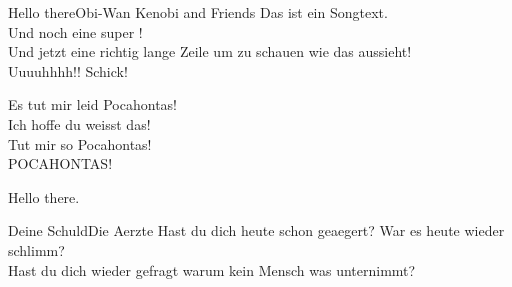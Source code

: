 \documentclass{liederbuch}
\begin{document}
\begin{song}{Hello there}{Obi-Wan Kenobi and Friends}
    Das ist ein  Songtext. \\
    Und noch eine super ! \\
    Und jetzt eine richtig lange Zeile um zu schauen wie das aussieht! \\
    Uuuuhhhh!! Schick!
    \begin{chorus}
    Es tut mir leid Pocahontas! \\
    Ich hoffe du weisst das! \\
    Tut mir so  Pocahontas! \\
    POCAHONTAS!
    \end{chorus}
    Hello there.
\end{song}

\begin{song}{Deine Schuld}{Die Aerzte}
    Hast du dich heute schon geaegert? War es heute wieder schlimm? \\
    Hast du dich wieder gefragt warum kein Mensch was unternimmt? \\
\end{song}
\end{document}
